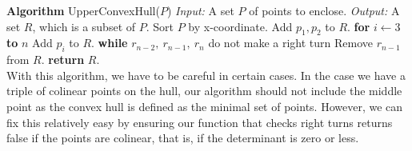 \documentclass[12pt]{article}
\begin{document}
\begin{multicols}{2}
\textbf{Algorithm} UpperConvexHull($P$) \newline 
\emph{Input:} A set $P$ of points to enclose. \newline
\emph{Output:} A set $R$, which is a subset of $P$. \newline
Sort $P$ by x-coordinate. \newline
Add $p_1, p_2$ to $R$. \newline
\textbf{for} $i \leftarrow 3$ \textbf{to} $n$ \newline
\indent Add $p_i$ to $R$. \newline
\indent \textbf{while} $r_{n-2},\ r_{n-1},\ r_n$ do not make a right turn \newline
\indent \indent Remove $r_{n-1}$ from $R$. \newline
\textbf{return} $R$. \newline \\
With this algorithm, we have to be careful in certain cases. In the case we have a triple of colinear points on the hull, our algorithm should not include the middle point as the convex hull is defined as the minimal set of points. However, we can fix this relatively easy by ensuring our function that checks right turns returns false if the points are colinear, that is, if the determinant is zero or less.

\end{multicols}
\end{document}
